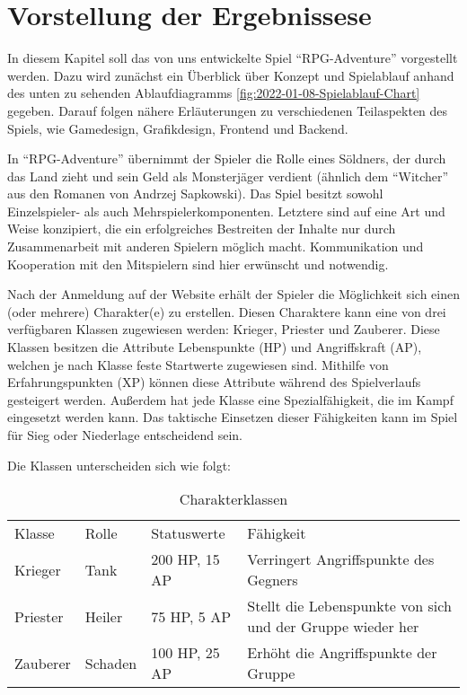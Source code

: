 

\section{Vorstellung der Ergebnissese}

In diesem Kapitel soll das von uns entwickelte Spiel \enquote{RPG-Adventure} vorgestellt werden. Dazu wird zunächst ein Überblick über Konzept und Spielablauf anhand des unten zu sehenden Ablaufdiagramms \ref{fig:2022-01-08-Spielablauf-Chart} gegeben. Darauf folgen nähere Erläuterungen zu verschiedenen Teilaspekten des Spiels, wie Gamedesign, Grafikdesign, Frontend und Backend. 

In \enquote{RPG-Adventure} übernimmt der Spieler die Rolle eines Söldners, der durch das Land zieht und sein Geld als Monsterjäger verdient (ähnlich dem \enquote{Witcher} aus den Romanen von Andrzej Sapkowski). Das Spiel besitzt sowohl Einzelspieler- als auch Mehrspielerkomponenten. Letztere sind auf eine Art und Weise konzipiert, die ein erfolgreiches Bestreiten der Inhalte nur durch Zusammenarbeit mit anderen Spielern möglich macht. Kommunikation und Kooperation mit den Mitspielern sind hier erwünscht und notwendig. 

Nach der Anmeldung auf der Website erhält der Spieler die Möglichkeit sich einen (oder mehrere) Charakter(e) zu erstellen. Diesen Charaktere kann eine von drei verfügbaren Klassen zugewiesen werden: Krieger, Priester und Zauberer. Diese Klassen besitzen die Attribute Lebenspunkte (HP) und Angriffskraft (AP), welchen je nach Klasse feste Startwerte zugewiesen sind. Mithilfe von Erfahrungspunkten (XP) können diese Attribute während des Spielverlaufs gesteigert werden. Außerdem hat jede Klasse eine Spezialfähigkeit, die im Kampf eingesetzt werden kann. Das taktische Einsetzen dieser Fähigkeiten kann im Spiel für Sieg oder Niederlage entscheidend sein.

Die Klassen unterscheiden sich wie folgt:

\begin{table}[H]
    \caption{Charakterklassen}
    \label{tlb: class_table}
\begin{tabular}{ |p{}||p{}|p{}|p{}|} \hline
    Klasse & Rolle & Statuswerte & Fähigkeit \\ \hhline{|=||=|=|=|}
    Krieger & Tank & 200 HP, 15 AP & Verringert Angriffspunkte des Gegners \\ \hline
    Priester & Heiler & 75 HP, 5 AP & Stellt die Lebenspunkte von sich und der Gruppe wieder her \\ \hline
    Zauberer & Schaden & 100 HP, 25 AP & Erhöht die Angriffspunkte der Gruppe \\ \hline
\end{tabular}
\end{table}

